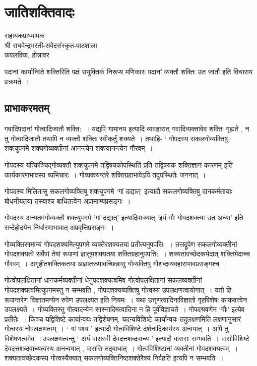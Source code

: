 {\fontsize{15}{17}\selectfont
\presetvalues
\chapter{जातिशक्तिवादः}


\begin{center}
\smallskip

सहायकप्राध्यापकः\\
श्री राघवेन्द्रभरती-सवेदसंस्कृत-पाठशाला\\
कवलक्कि, होन्नावर
\addrule
\end{center}

पदानां कार्यान्विते शक्तिरिति पक्षं सयुक्तिकं निरूप्य मणिकारः पदानां व्यक्तौ शक्तिः उत जातौ इति विचाराय प्रक्रमते~। 

\section*{प्राभाकरमतम्}

गवादिपदानां गोत्वादिजातौ शक्ति:~। यद्यपि गामानय इत्यादि व्यवहारात् गवादिव्यक्तावेव शक्तिः गृह्यते , न तु गोत्वादिजातौ तथापि न व्यक्तौ शक्तिः स्वीकर्तुं शक्यते~। तथाहि- ‘ गोपदस्य सकलगोव्यक्तिषु शक्त्युपगमे शक्यगोव्यक्तीनां आनन्त्येन शक्त्यानन्त्येन गौरवम्~। 

गोपदस्य यत्किञ्चिद्गोव्यक्तौ शक्त्युपगमे तद्विषयकोपस्थितिं प्रति तद्विषयक शक्तिज्ञानं कारणम् इति कार्यकारणभावस्य व्यभिचारः~। गोव्यक्त्यन्तरे शक्तिग्रहाभावेऽपि तदुपस्थितेः जननात्~। 

गोपदस्य मिलितासु सकलगोव्यक्तिषु शक्त्युपगमे ‘गां दद्यात्’ इत्यादौ सकलगोव्यक्तिषु दानकर्मतायाः बोधनीयतया तस्याश्च बाधितत्वेन अप्रामाण्यप्रसङ्गः~। 

गोपदस्य अन्यतमगोव्यक्तौ शक्त्युपगमे ‘गां दद्यात्’ इत्यादिवाक्यात् ‘इयं गौः गोपदशक्त्या उत अन्या’ इति सन्देहोदयेन निर्धारणाभावात् अप्रवृत्तिप्रसङ्गः~। 

गोव्यक्तिसामान्यं गोपदशक्यमित्युपगमे व्यक्तेरशक्यतया प्रतीत्यनुपपत्ति:~। तत्तद्रूपेण सकलगोव्यक्तीनां गोपदशक्यत्वे सर्वेषां तेषां रूपाणां ज्ञातुमशक्यतया शक्तिग्रहानुपपत्ति:~। शक्यतावच्छेदकभेदात् शक्तिभेदाच्च गौरवम्~। अगृहीतशक्तिकतया अज्ञातरूपावच्छिन्नासु गोव्यक्तिषु गोशब्दव्यवहाराभावप्रसङ्गश्च~। 

गोत्वोपलक्षितानां धानकर्मव्यक्तीनां धेनुपदशक्यत्वमिव गोत्वोपलक्षितानां सकल\-व्यक्तीनां गोपदशक्यत्वमित्युपगमस्तु न सम्भवति , गोपदशक्यव्यक्तिषु गोत्वस्य उपलक्षणत्वायोगात्~। यतो हि रूपान्तरेण विज्ञातमन्येन रुपेण उपलक्ष्यत इति नियमः~। यथा उत्तृणत्वादिना\break विज्ञातो गृहविशेषः काकवत्त्वेन उपलक्ष्यते~। गोव्यक्तिस्तु गोत्वादन्येन सास्नादिमत्वादिना न हि पूर्वंविज्ञायते~। गोपदश्रवणेन ‘गौः’ इत्येव प्रतीतेः~। किञ्च यद्विशिष्टे कार्यान्वयः तद्विशेषणम्, यदन्यविशिष्टे कार्यान्वयः तदुलक्षणमिति लक्षणानुसारं गोत्वस्य नोपलक्षणत्वम्~। ‘ गां पश्य ’ इत्यादौ गोत्वविशिष्टे दर्शनादिकार्यस्य अन्वयात्~। अपि तु विशेषणत्वमेव~।\break उपलक्षणत्वन्तु ‘ अयं वासस्वी देवदत्तशब्दवाच्य ’ इत्यादौ वाससः सम्भवति~। वासोविशिष्टे देवदत्तशब्दवाच्यत्वस्य अनन्वयात् , वाससि तद्बाधात्~। गोत्वविशिष्टानां व्यक्तीनां गोपदशक्यत्वम्~। शक्यतावच्छेदकस्य गोत्वस्यैक्यात् सकलगोव्यक्तिनिष्ठशक्तेरैक्यं निर्वहति इत्यपि न सम्भवति~। 

}
